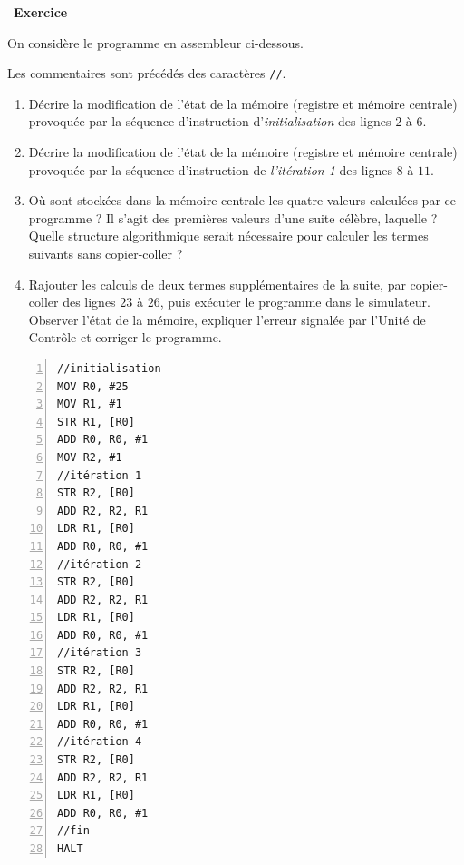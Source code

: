 \documentclass[a4paper, french, 11pt]{article}  %
\newcounter{exercice}
\newenvironment{exercice}[1]
{\par \medskip   \addtocounter{exercice}{1} \noindent  
\begin{bclogo}[arrondi =0.1,   noborder = true, logo=\bccrayon, marge=4]{~\textbf{Exercice} \textbf{\theexercice} {\itshape #1} }  \par}
{
\end{bclogo}
 \par \bigskip }
\newcounter{alg}
\newcounter{prog}
\begin{document}
\begin{exercice}{}

On considère le programme en assembleur ci-dessous. 

Les commentaires sont précédés des caractères \verb+//+.

\begin{enumerate}
	\item Décrire la modification de l'état de la mémoire (registre et mémoire centrale) provoquée par la séquence  d'instruction d'\textit{initialisation} des lignes $2$ à $6$.
	  \item Décrire la modification de l'état de la mémoire (registre et mémoire centrale) provoquée par la séquence  d'instruction de \textit{l'itération 1} des lignes $8$ à $11$.
	  \item Où sont stockées dans la mémoire centrale les quatre valeurs calculées par ce programme ? Il s'agit des premières valeurs d'une suite célèbre, laquelle ? Quelle structure algorithmique serait nécessaire pour calculer les termes suivants sans copier-coller ?
	  \item Rajouter les calculs de deux termes supplémentaires de la suite, par copier-coller des lignes $23$ à $26$, puis exécuter le programme dans le simulateur. Observer l'état de la mémoire, expliquer  l'erreur signalée  par l'Unité de Contrôle et corriger le programme.
\end{enumerate}

\begin{lstlisting}[numbers=left, language={[x86masm]Assembler}]
//initialisation
MOV R0, #25
MOV R1, #1
STR R1, [R0]
ADD R0, R0, #1
MOV R2, #1
//itération 1
STR R2, [R0]
ADD R2, R2, R1
LDR R1, [R0]
ADD R0, R0, #1
//itération 2
STR R2, [R0]
ADD R2, R2, R1
LDR R1, [R0]
ADD R0, R0, #1
//itération 3
STR R2, [R0]
ADD R2, R2, R1
LDR R1, [R0]
ADD R0, R0, #1
//itération 4
STR R2, [R0]
ADD R2, R2, R1
LDR R1, [R0]
ADD R0, R0, #1
//fin
HALT
\end{lstlisting}

\end{exercice}
\end{document}
